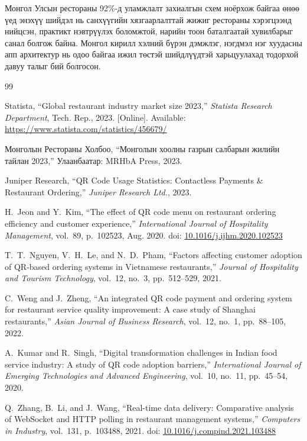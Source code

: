 \documentclass[12pt,a4paper]{article}
\begin{document}
Монгол Улсын рестораны 92\%-д уламжлалт захиалгын схем ноёрхож
байгаа өнөө үед энэхүү шийдэл нь санхүүгийн хязгаарлалттай жижиг
рестораны хэрэгцээнд нийцсэн, практикт нэвтрүүлэх боломжтой,
нарийн тоон баталгаатай хувилбарыг санал болгож байна.
Монгол кирилл хэлний бүрэн дэмжлэг, нэгдмэл нэг хуудасны апп
архитектур нь одоо байгаа ижил төстэй шийдлүүдтэй харьцуулахад
тодорхой давуу талыг бий болгосон.

\begin{thebibliography}{99}

Statista, ``Global restaurant industry market size 2023,''
\textit{Statista Research Department}, Tech. Rep., 2023.
[Online]. Available: \url{https://www.statista.com/statistics/456679/}

Монголын Рестораны Холбоо,
``Монголын хоолны газрын салбарын жилийн тайлан 2023,''
Улаанбаатар: MRHbA Press, 2023.

Juniper Research,
``QR Code Usage Statistics: Contactless Payments \& Restaurant Ordering,''
\textit{Juniper Research Ltd.}, 2023.

H.~Jeon and Y.~Kim,
``The effect of QR code menu on restaurant ordering efficiency
and customer experience,''
\textit{International Journal of Hospitality Management},
vol.~89, p.~102523, Aug. 2020.
doi: \href{https://doi.org/10.1016/j.ijhm.2020.102523}{10.1016/j.ijhm.2020.102523}

T.~T.~Nguyen, V.~H.~Le, and N.~D.~Pham,
``Factors affecting customer adoption of QR-based ordering
systems in Vietnamese restaurants,''
\textit{Journal of Hospitality and Tourism Technology},
vol.~12, no.~3, pp.~512--529, 2021.

C.~Weng and J.~Zheng,
``An integrated QR code payment and ordering system for
restaurant service quality improvement: A case study of
Shanghai restaurants,''
\textit{Asian Journal of Business Research},
vol.~12, no.~1, pp.~88--105, 2022.

A.~Kumar and R.~Singh,
``Digital transformation challenges in Indian food service
industry: A study of QR code adoption barriers,''
\textit{International Journal of Emerging Technologies
and Advanced Engineering}, vol.~10, no.~11, pp.~45--54, 2020.

Q.~Zhang, B.~Li, and J.~Wang,
``Real-time data delivery: Comparative analysis of WebSocket
and HTTP polling in restaurant management systems,''
\textit{Computers in Industry}, vol.~131, p.~103488, 2021.
doi: \href{https://doi.org/10.1016/j.compind.2021.103488}{10.1016/j.compind.2021.103488}


\end{thebibliography}
\end{document}
